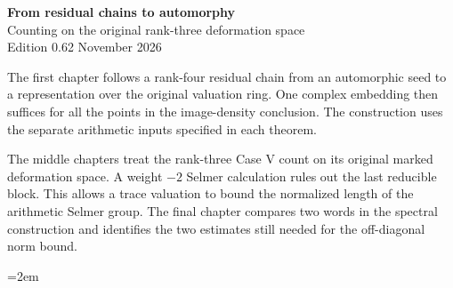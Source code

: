 \begin{center}
{\Large\bfseries From residual chains to automorphy}\\[4pt]
{\large Counting on the original rank-three deformation space}\\[4pt]
Edition 0.62  November 2026
\end{center}

The first chapter follows a rank-four residual chain from an automorphic seed
to a representation over the original valuation ring. One complex embedding
then suffices for all the points in the image-density conclusion.
The construction uses the separate arithmetic inputs specified in each theorem.

The middle chapters treat the rank-three Case V count on its original marked
deformation space. A weight $-2$ Selmer calculation rules out the last
reducible block. This allows a trace valuation to bound the normalized
length of the arithmetic Selmer group. The final chapter compares two words
in the spectral construction and identifies the two estimates still needed
for the off-diagonal norm bound.

\begingroup\emergencystretch=2em






\endgroup

